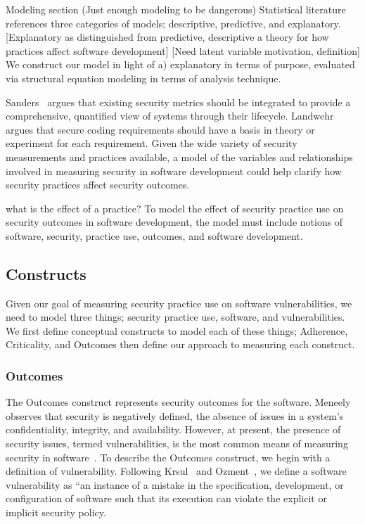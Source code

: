 Modeling section (Just enough modeling to be dangerous)
Statistical literature references three categories of models; descriptive, predictive, and explanatory. 
[Explanatory as distinguished from predictive, descriptive a theory for how practices affect software development]
[Need latent variable motivation, definition]
We construct our model in light of a) explanatory in terms of purpose, evaluated via structural equation modeling in terms of analysis technique.

Sanders~\cite{sanders2009security} argues that existing security metrics should be integrated to provide a comprehensive, quantified view of systems through their lifecycle. Landwehr~\cite{landwehr2015we} argues that secure coding requirements should have a basis in theory or experiment for each requirement. Given the wide variety of security measurements and practices available, a model of the variables and relationships involved in measuring security in software development could help clarify how security practices affect security outcomes. 

what is the effect of a practice?
To model the effect of security practice use on security outcomes in software development, the model must include notions of software, security, practice use, outcomes, and software development. 
 
\subsection{Constructs}
Given our goal of measuring security practice use on software vulnerabilities, we need to model three things; security practice use, software, and vulnerabilities.  We first define conceptual constructs to model each of these things; Adherence, Criticality, and Outcomes then define our approach to measuring each construct.
\subsubsection{Outcomes}
\label{sec:model_contruct_outcome}
The Outcomes construct represents security outcomes for the software. Meneely~\cite{meneely2016security} observes that security is negatively defined, the absence of issues in a system's confidentiality, integrity, and availability. 
However, at present, the presence of security issues, termed vulnerabilities, is the most common means of measuring security in software~\cite{morrison2014mapping}.
To describe the Outcomes construct, we begin with a definition of vulnerability. Following Krsul~\cite{krsul1998software} and Ozment~\cite{ozment2007vulnerability}, we define a software vulnerability as “an instance of a mistake in the specification, development, or configuration of software such that its execution can violate the explicit or implicit security policy. 

